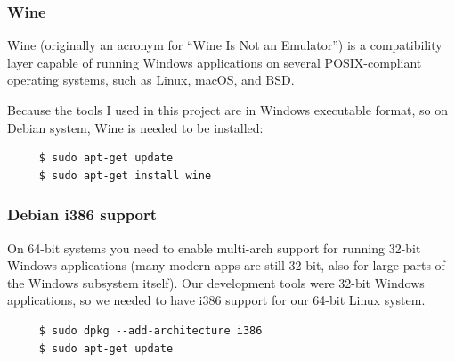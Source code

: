 \documentclass{swfcthesis}
\begin{document}
\subsubsection{Wine}

Wine (originally an acronym for ``Wine Is Not an Emulator'') is a compatibility layer
capable of running Windows applications on several POSIX-compliant operating systems, such
as Linux, macOS, and BSD\cite{wiki:wine}.

Because the tools I used in this project are in Windows executable format, so on Debian system,
Wine is needed to be installed:

\begin{verbatim}
     $ sudo apt-get update
     $ sudo apt-get install wine
\end{verbatim}

\subsubsection{Debian i386 support}

On 64-bit systems you need to enable multi-arch support for running 32-bit Windows
applications (many modern apps are still 32-bit, also for large parts of the Windows
subsystem itself). Our development tools were 32-bit Windows applications, so we needed to
have i386 support for our 64-bit Linux system.

\begin{verbatim}
     $ sudo dpkg --add-architecture i386
     $ sudo apt-get update
\end{verbatim}

\iffalse



\end{document}
